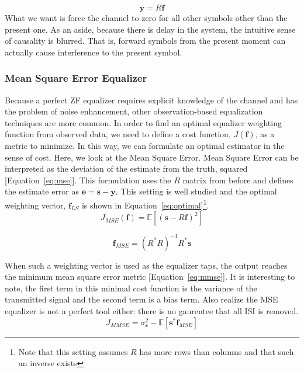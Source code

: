 \documentclass[]{article}
\begin{document}
\begin{equation}
\label{eq:equalizerMatrix}
\mathbf{y} = R\mathbf{f}
\end{equation}
What we want is force the channel to zero for all other symbols other than the present one.  As an aside, because there is delay in the system, the intuitive sense of causality is blurred. That is, forward symbols from the present moment can actually cause interference to the present symbol. \\

\subsubsection{Mean Square Error Equalizer}
\label{sec:optimal}
Because a perfect ZF equalizer requires explicit knowledge of the channel and has the problem of noise enhancement, other observation-based equalization techniques are more common.  In order to find an optimal equalizer weighting function from observed data, we need to define a cost function, $J(\mathbf{f})$, as a metric to minimize.  In this way, we can formulate an optimal estimator in the sense of cost.  Here, we look at the Mean Square Error.  Mean Square Error can be interpreted as the deviation of the estimate from the truth, squared [Equation~\ref{eq:mse}].  This formulation uses the $R$ matrix from before and defines the estimate error as $\mathbf{e} = \mathbf{s} - \mathbf{y}$.  This setting is well studied and the optimal weighting vector, $\mathbf{f}_{LS}$ is shown in Equation~\ref{eq:optimal}\footnote{Note that this setting assumes $R$ has more rows than columns and that such an inverse exists}.
\begin{equation}
\label{eq:mse} 
J_{MSE} \left( \mathbf{f}\right) = \mathbb{E} \left[ \left(\mathbf{s} - R \mathbf{f} \right)^2 \right]
\end{equation}

\begin{equation}
\label{eq:optimal}
\mathbf{f}_{MSE} = \left(R^{\ast}R\right)^{-1}R^{\ast}\mathbf{s}
\end{equation}

When such a weighting vector is used as the equalizer taps, the output reaches the minimum mean square error metric  [Equation~\ref{eq:mmse}].  It is interesting to note, the first term in this minimal cost function is the variance of the transmitted signal and the second term is a bias term.  Also realize the MSE equalizer is not a perfect tool either: there is no gaurentee that all ISI is removed.
\begin{equation}
\label{eq:mmse}
J_{MMSE} =  \sigma_{\mathbf{s}}^{2} - \mathbb{E} \left[ \mathbf{s}^{\ast} \mathbf{f}_{MSE} \right]
\end{equation}
\end{document}
